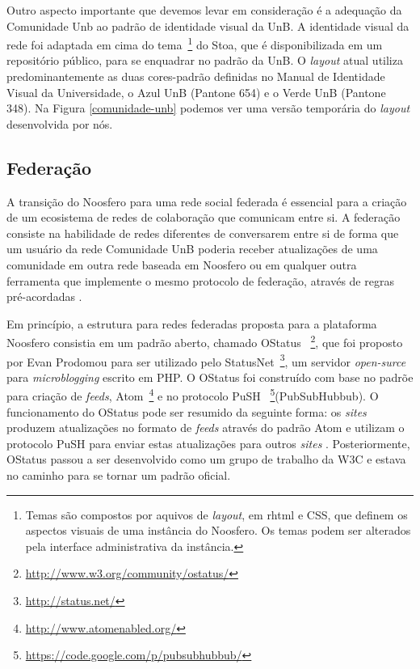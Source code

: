 
Outro aspecto importante que devemos levar em consideração é a adequação da
Comunidade Unb ao padrão de identidade visual da UnB.
A identidade visual da rede foi adaptada em cima do tema~\footnote{Temas são
compostos por aquivos de \textit{layout}, em rhtml e CSS, que definem os aspectos
visuais de uma instância do Noosfero. Os temas podem ser alterados pela interface
administrativa da instância.} do Stoa, que é disponibilizada em um repositório
público, para se enquadrar no padrão da UnB.
%
O \textit{layout} atual utiliza predominantemente as duas cores-padrão definidas
no Manual de Identidade Visual da Universidade\cite{visualUnB}, o Azul UnB
(Pantone 654) e o Verde UnB (Pantone 348). Na Figura \ref{comunidade-unb}
podemos ver uma versão temporária do \textit{layout} desenvolvida por nós.


\subsection{Federação}

A transição do Noosfero para uma rede social federada é essencial para a criação
de um ecosistema de redes de colaboração que comunicam entre si. A federação
consiste na habilidade de redes diferentes de conversarem entre si de forma que
um usuário da rede Comunidade UnB poderia receber atualizações de uma comunidade
em outra rede baseada em Noosfero ou em qualquer outra ferramenta que implemente
o mesmo protocolo de federação, através de regras pré-acordadas
\cite{prodomou2010}.

Em princípio, a estrutura para redes federadas proposta para a plataforma Noosfero
consistia em um padrão aberto, chamado OStatus
~\footnote{\url{http://www.w3.org/community/ostatus/}}, que foi proposto
por Evan Prodomou para ser utilizado pelo StatusNet~\footnote{\url{
http://status.net/}}, um servidor  \textit{open-surce} para
\textit{microblogging} escrito em PHP.
%
O OStatus foi construído com base no padrõe para criação de \textit{feeds},
Atom~\footnote{\url{http://www.atomenabled.org/}} e no protocolo PuSH
~\footnote{\url{https://code.google.com/p/pubsubhubbub/}}(PubSubHubbub).
O funcionamento do OStatus pode ser resumido da seguinte forma:
os \textit{sites} produzem atualizações no formato de \textit{feeds} através
do padrão Atom e utilizam o protocolo PuSH para enviar estas atualizações
para outros \textit{sites} \cite{OStatusBasics}.
%
Posteriormente, OStatus passou a ser desenvolvido como um grupo de trabalho
da W3C e estava no caminho para se tornar um padrão oficial. 

